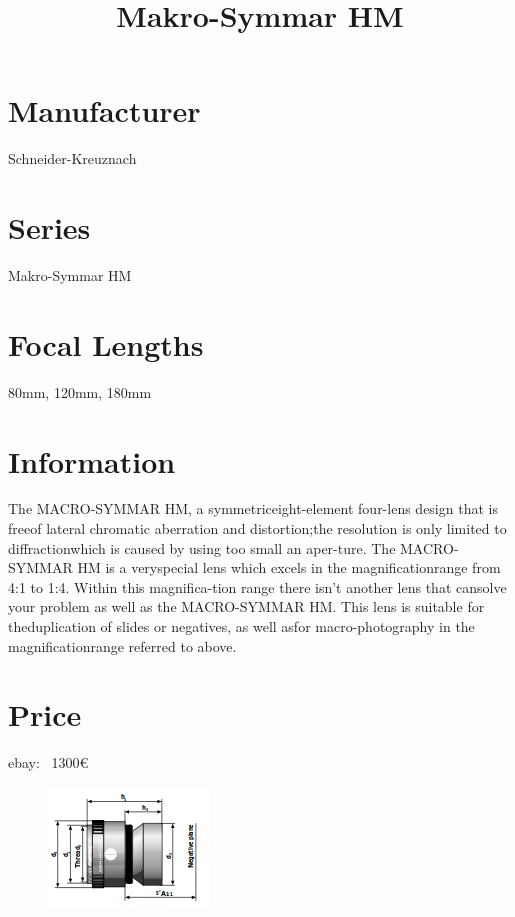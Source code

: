 \documentclass{article}
\begin{document}
\usepackage{titlesec}
\usepackage{graphicx}


\title{Makro-Symmar HM}
\section{Manufacturer}
Schneider-Kreuznach
\section{Series}
Makro-Symmar HM
\section{Focal Lengths}
80mm, 120mm, 180mm   
\section{Information}

The MACRO-SYMMAR HM, a symmetriceight-element four-lens design that is freeof lateral chromatic aberration and distortion;the resolution is only limited to diffractionwhich is caused by using too small an aper-ture. The MACRO-SYMMAR HM is a veryspecial lens which excels in the magnificationrange from 4:1 to 1:4. Within this magnifica-tion range there isn’t another lens that cansolve your problem as well as the MACRO-SYMMAR HM. This lens is suitable for theduplication of slides or negatives, as well asfor macro-photography in the magnificationrange referred to above.


\section{Price}

ebay: ~1300€

\begin{figure}
\centering
\includegraphics[width=\textwidth]{makro-symmar-hm.png}
\end{figure}
\end{document}
